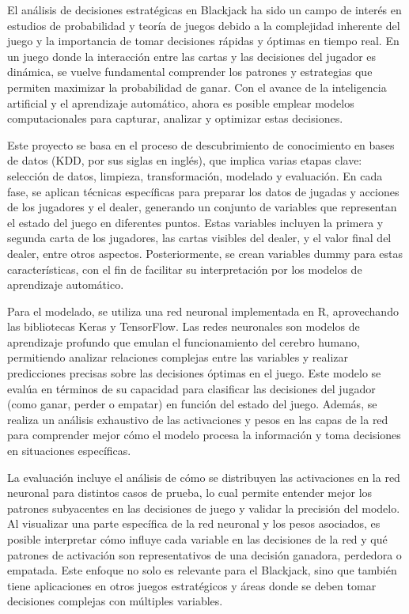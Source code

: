 \documentclass[conference,final,]{IEEEtran}
\begin{document}
El análisis de decisiones estratégicas en Blackjack ha sido un campo de
interés en estudios de probabilidad y teoría de juegos debido a la
complejidad inherente del juego y la importancia de tomar decisiones
rápidas y óptimas en tiempo real. En un juego donde la interacción entre
las cartas y las decisiones del jugador es dinámica, se vuelve
fundamental comprender los patrones y estrategias que permiten maximizar
la probabilidad de ganar. Con el avance de la inteligencia artificial y
el aprendizaje automático, ahora es posible emplear modelos
computacionales para capturar, analizar y optimizar estas decisiones.

Este proyecto se basa en el proceso de descubrimiento de conocimiento en
bases de datos (KDD, por sus siglas en inglés), que implica varias
etapas clave: selección de datos, limpieza, transformación, modelado y
evaluación. En cada fase, se aplican técnicas específicas para preparar
los datos de jugadas y acciones de los jugadores y el dealer, generando
un conjunto de variables que representan el estado del juego en
diferentes puntos. Estas variables incluyen la primera y segunda carta
de los jugadores, las cartas visibles del dealer, y el valor final del
dealer, entre otros aspectos. Posteriormente, se crean variables dummy
para estas características, con el fin de facilitar su interpretación
por los modelos de aprendizaje automático.

Para el modelado, se utiliza una red neuronal implementada en R,
aprovechando las bibliotecas Keras y TensorFlow. Las redes neuronales
son modelos de aprendizaje profundo que emulan el funcionamiento del
cerebro humano, permitiendo analizar relaciones complejas entre las
variables y realizar predicciones precisas sobre las decisiones óptimas
en el juego. Este modelo se evalúa en términos de su capacidad para
clasificar las decisiones del jugador (como ganar, perder o empatar) en
función del estado del juego. Además, se realiza un análisis exhaustivo
de las activaciones y pesos en las capas de la red para comprender mejor
cómo el modelo procesa la información y toma decisiones en situaciones
específicas.

La evaluación incluye el análisis de cómo se distribuyen las
activaciones en la red neuronal para distintos casos de prueba, lo cual
permite entender mejor los patrones subyacentes en las decisiones de
juego y validar la precisión del modelo. Al visualizar una parte
específica de la red neuronal y los pesos asociados, es posible
interpretar cómo influye cada variable en las decisiones de la red y qué
patrones de activación son representativos de una decisión ganadora,
perdedora o empatada. Este enfoque no solo es relevante para el
Blackjack, sino que también tiene aplicaciones en otros juegos
estratégicos y áreas donde se deben tomar decisiones complejas con
múltiples variables.
\end{document}
